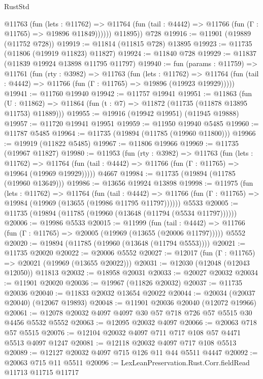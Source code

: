 \begin{lexlean}{RustStd}
\begin{coremodule}
            @11763
              (fun (lets : @11762) =>
              @11764 (fun (tail : @4442) => @11766 (fun (Γ : @11765) => @19896 @11849))))))
        @11895))
    @728
@19916 := @11901 (@19889 (@11752 @728))
@19919 := @11814 (@11815 @728) @13895
@19923 := @11735 (@11806 (@19919 @11823) @11827)
@19924 := @11840 @728
@19929 := @11837 (@11839 @19924 @13898 @11795 @11797)
@19940 := fun (params : @11759) =>
  @11761
    (fun (rty : @3982) =>
    @11763
      (fun (lets : @11762) =>
      @11764 (fun (tail : @4442) => @11766 (fun (Γ : @11765) => @19896 (@19923 @19929)))))
@19941 := @11760 @19940
@19942 := @11757 @19941
@19951 := @11863
    (fun (U : @11862) => @11864 (fun (t : @7) => @11872 (@11735 (@11878 @13895 @11753) @11889)))
@19955 := @19916 (@19942 @19951) (@11945 @19888)
@19957 := @11720 @19941 @19951
@19959 := @11950 @19940 @5485
@19960 := @11787 @5485
@19964 := @11735 (@19894 (@11785 (@19960 @11800)))
@19966 := @19919 (@11822 @5485)
@19967 := @11806 @19966
@19969 := @11735 (@19967 @11827)
@19980 := @11953
    (fun (rty : @3982) =>
    @11763
      (fun (lets : @11762) =>
      @11764 (fun (tail : @4442) => @11766 (fun (Γ : @11765) => @19964 (@19969 @19929)))))
    @4667
@19984 := @11735 (@19894 (@11785 (@19960 @13649)))
@19986 := @13656 @19924 @13898
@19998 := @11975
    (fun (lets : @11762) =>
    @11764
      (fun (tail : @4442) =>
      @11766 (fun (Γ : @11765) => @19984 (@19969 (@13655 (@19986 @11795 @11797))))))
    @5533
@20005 := @11735 (@19894 (@11785 (@19960 (@13648 (@11794 (@5534 @11797))))))
@20006 := @19986 @5533
@20015 := @11999
    (fun (tail : @4442) => @11766 (fun (Γ : @11765) => @20005 (@19969 (@13655 (@20006 @11797)))))
    @5552
@20020 := @19894 (@11785 (@19960 (@13648 (@11794 @5553))))
@20021 := @11735 @20020
@20022 := @20006 @5552
@20027 := @12017 (fun (Γ : @11765) => @20021 (@19969 (@13655 @20022)))
@20031 := @12030 (@12048 (@12043 @12050)) @11813
@20032 := @18958 @20031
@20033 := @20027 @20032
@20034 := @11901 @20020
@20036 := @19967 (@11826 @20032)
@20037 := @11735 @20036
@20040 := @11833 @20032 @13654 @20022
@20044 := @20034 (@20037 @20040) (@12067 @19893)
@20048 := @11901 @20036 @20040 (@12072 @19966)
@20061 := @12078 @20032 @4097 @4097 @30 @57 @718 @726 @57 @5515 @30 @4456 @5532 @5552
@20063 := @12095 @20032 @4097
@20066 := @20063 @718 @57 @5515
@20076 := @12104 @20032 @4097 @711 @717 @108 @57 @4471 @5513 @4097 @1247
@20081 := @12118 @20032 @4097 @717 @108 @5513
@20089 := @12127 @20032 @4097 @715 @126 @11 @44 @5511 @4447
@20092 := @20063 @715 @11 @5511
@20096 := LexLeanPreservation.Rust.Corr.fieldRead @11713 @11715 @11717

\end{coremodule}
\end{lexlean}
